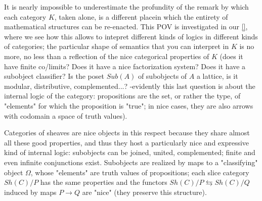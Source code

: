 \documentclass[a4paper, 11pt]{article}
\begin{document}
It is nearly impossible to underestimate the profundity of the remark by which each category $K$, taken alone, is a different placein which the entirety of mathematical structures can be re-enacted. This POV is investigated in our \ref{}, where we see how this allows to intepret different kinds of logics in different kinds of categories; the particular shape of semantics that you can interpret in $K$ is no more, no less than a reflection of the nice categorical properties of $K$ (does it have finite co/limits? Does it have a nice factorization system? Does it have a subobject classifier? Is the poset $Sub(A)$ of subobjects of $A$ a lattice, is it modular, distributive, complemented...? -evidently this last question is about the internal logic of the category: propositions are the set, or rather the type, of "elements" for which the proposition is "true"; in nice cases, they are also arrows with codomain a space of truth values).

Categories of sheaves are nice objects in this respect because they share almost all these good properties, and thus they host a particularly nice and expressive kind of internal logic: subobjects can be joined, united, complemented; finite and even infinite conjunctions exist. Subobjects are realized by maps to a "classifying" object $\Omega$, whose "elements" are truth values of propositions; each slice category $Sh(C)/P$ has the same properties and the functors $Sh(C)/P \leftrightarrows Sh(C)/Q$ induced by maps $P\to Q$ are "nice" (they preserve this structure).
\end{document}

